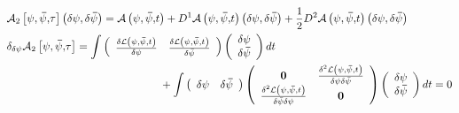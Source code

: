 \documentclass[aps,preprint]{revtex4}%
\begin{document}
\begin{align}
&  \mathcal{A}_{2}\left[  \mathbf{\psi},\mathbf{\bar{\psi},}\tau\right]
\left(  \delta\mathbf{\psi,\delta\bar{\psi}}\right)  =\mathcal{A}\left(
\mathbf{\psi},\mathbf{\bar{\psi},}t\right)  +D^{1}\mathcal{A}\left(
\mathbf{\psi},\mathbf{\bar{\psi},}t\right)  \left(  \delta\mathbf{\psi
,\delta\bar{\psi}}\right)  +\frac{1}{2}D^{2}\mathcal{A}\left(  \mathbf{\psi
},\mathbf{\bar{\psi},}t\right)  \left(  \delta\mathbf{\psi,\delta\bar{\psi}%
}\right)  \nonumber\\
&  \delta_{\delta\mathbf{\psi}}\mathcal{A}_{2}\left[  \mathbf{\psi
},\mathbf{\bar{\psi},}\tau\right]  =\int\left(
\begin{array}
[c]{cc}%
\frac{\delta\mathcal{L}\left(  \mathbf{\psi},\mathbf{\bar{\psi},}t\right)
}{\delta\psi} & \frac{\delta\mathcal{L}\left(  \mathbf{\psi},\mathbf{\bar
{\psi},}t\right)  }{\delta\bar{\psi}}%
\end{array}
\right)  \left(
\begin{array}
[c]{c}%
\delta\mathbf{\psi}\\
\delta\mathbf{\bar{\psi}}%
\end{array}
\right)  dt\\
&  \qquad\qquad\qquad\qquad\qquad\qquad\qquad+\int\left(
\begin{array}
[c]{cc}%
\delta\mathbf{\psi} & \delta\mathbf{\bar{\psi}}%
\end{array}
\right)  \left(
\begin{array}
[c]{cc}%
\mathbf{0} & \frac{\delta^{2}\mathcal{L}\left(  \mathbf{\psi},\mathbf{\bar
{\psi},}t\right)  }{\delta\psi\delta\bar{\psi}}\\
\frac{\delta^{2}\mathcal{L}\left(  \mathbf{\psi},\mathbf{\bar{\psi},}t\right)
}{\delta\bar{\psi}\delta\psi} & \mathbf{0}%
\end{array}
\right)  \left(
\begin{array}
[c]{c}%
\delta\mathbf{\psi}\\
\delta\mathbf{\bar{\psi}}%
\end{array}
\right)  dt=0
\end{align}%
\end{document}
